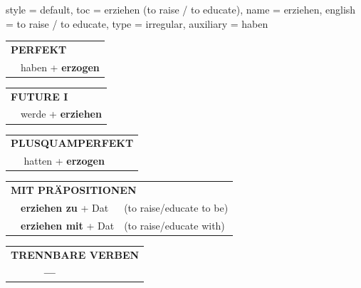 \begin{verbentry}{
  style = {default},
  toc = {erziehen (to raise / to educate)},
  name = {erziehen},
  english = {to raise / to educate},
  type = {irregular},
  auxiliary = {haben}
}
 \begin{tabular}{rl}
     \multicolumn{2}{l}{\textbf{PERFEKT}}\\
   & haben + \textbf{erzogen}\\
  \end{tabular}
\hfill
   \begin{tabular}{rl}
    \multicolumn{2}{l}{\textbf{FUTURE I} }\\
   & werde + \textbf{erziehen}\\
  \end{tabular}
\hfill
   \begin{tabular}{rl}
      \multicolumn{2}{l}{\textbf{PLUSQUAMPERFEKT}}\\
   & hatten + \textbf{erzogen}\\
  \end{tabular}

   \vspace{10pt}

   \begin{tabular}{lll}
      \multicolumn{3}{l}{\textbf{MIT PRÄPOSITIONEN}}\\
& \textbf{erziehen zu} + Dat & (to raise/educate to be)\\
& \textbf{erziehen mit} + Dat & (to raise/educate with)\\
\end{tabular}
  \hfill
   \begin{tabular}{lll}
\multicolumn{3}{l}{\textbf{TRENNBARE VERBEN}}\\
& \textbf{---} & \\
\end{tabular}

  \vspace{-5pt}
\end{verbentry}

